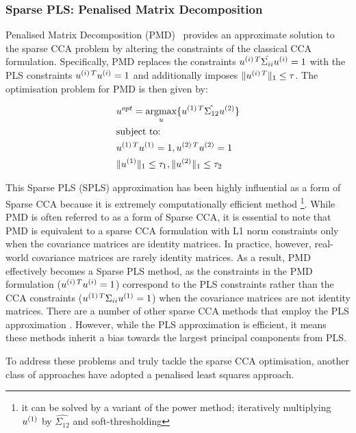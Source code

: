 \subsubsection{Sparse PLS: Penalised Matrix Decomposition}
Penalised Matrix Decomposition (PMD)~\citep{witten2009penalized} provides an approximate solution to the sparse CCA problem by altering the constraints of the classical CCA formulation.
Specifically, PMD replaces the constraints \(u^{(i)\,T} \hat{\Sigma_{ii}} u^{(i)} = 1\) with the PLS constraints \(u^{(i)\,T} u^{(i)}= 1\) and additionally imposes \(\|u^{(i)\,T}\|_1 \leq \tau\).
The optimisation problem for PMD is then given by:

\begin{align}
    & u^{opt}=\underset{u}{\mathrm{argmax}}\{ u^{(1)\,T} \hat{\Sigma_{12}} u^{(2)} \} \\
    & \text{subject to:} \notag \\
    & u^{(1)\,T} u^{(1)} = 1 , u^{(2)\,T} u^{(2)} = 1 \notag \\
    & \|u^{(1)}\|_1 \leq \tau_1 , \|u^{(2)}\|_1 \leq \tau_2 \notag
\end{align}

This Sparse PLS (SPLS) approximation has been highly influential as a form of Sparse CCA because it is extremely computationally efficient method \footnote{it can be solved by a variant of the power method; iteratively multiplying $u^{(1)}$ by $\hat{\Sigma_{12}}$ and soft-thresholding}.
While PMD is often referred to as a form of Sparse CCA, it is essential to note that PMD is equivalent to a sparse CCA formulation with L1 norm constraints only when the covariance matrices are identity matrices. In practice, however, real-world covariance matrices are rarely identity matrices. As a result, PMD effectively becomes a Sparse PLS method, as the constraints in the PMD formulation ($u^{(i)\,T} u^{(i)} = 1$) correspond to the PLS constraints rather than the CCA constraints ($u^{(1)\,T}\Sigma_{ii} u^{(1)} = 1$) when the covariance matrices are not identity matrices.
There are a number of other sparse CCA methods that employ the PLS approximation \citep{parkhomenko2009sparse, waaijenborg2008quantifying, lindenbaum2021l0}.
However, while the PLS approximation is efficient, it means these methods inherit a bias towards the largest principal components from PLS.

To address these problems and truly tackle the sparse CCA optimisation, another class of approaches have adopted a penalised least squares approach.

